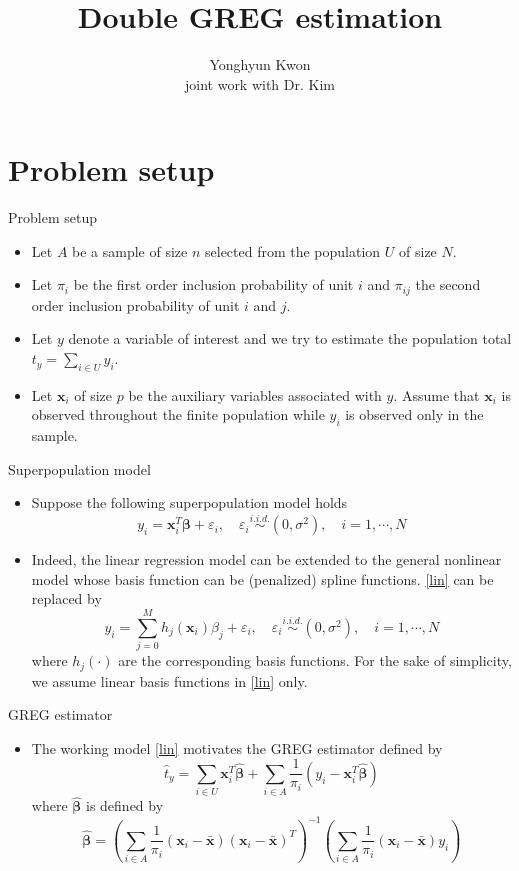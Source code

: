 \documentclass[usenames,dvipsnames, xcolor=table]{beamer}
\author[Kwon]{Yonghyun Kwon
\\ 
joint work with Dr. Kim}
\title[Double GREG]{  
Double GREG estimation
}
\institute{Iowa State Univeristy}
\renewcommand{\bf}[1]{\boldsymbol{\mathbf{#1}}}
\newcommand{\pa}[1]{\left(#1\right)} %
\newcommand{\iid}{\stackrel{i.i.d.}{\sim}}
\begin{document}
\frame{\titlepage}

\section{Problem setup}

\begin{frame}{Problem setup}
\begin{itemize}
    \item Let \(A\) be a sample of size \(n\) selected from the population \(U\) of size \(N\). 
    \item Let $\pi_i$ be the first order inclusion probability of unit $i$ and $\pi_{ij}$ the second order inclusion probability of unit $i$ and $j$.
    \item Let \(y\) denote a variable of interest and we try to estimate the population total \(t_y = \sum_{i \in U} y_i\). 
    \item Let \(\bf x_{i}\) of size \(p\) be the auxiliary variables associated with \(y\). 
Assume that $\bf x_i$ is observed throughout the finite population while $y_i$ is observed only in the sample.
\end{itemize}
\end{frame}

\begin{frame}{Superpopulation model}
    \begin{itemize}
        \item Suppose the following superpopulation model holds
\begin{equation}
    y_i = \bf x_i^T \bf \beta + \varepsilon_i, \quad \varepsilon_i \iid (0,\sigma^2), \quad i = 1, \cdots, N \label{lin}
\end{equation}
\item Indeed, the linear regression model can be extended to the general nonlinear model whose basis function can be (penalized) spline functions. \eqref{lin} can be replaced by
\begin{equation}
    y_i = \sum_{j = 0}^Mh_j(\bf x_i) \beta_j + \varepsilon_i, \quad \varepsilon_i \iid (0,\sigma^2), \quad i = 1, \cdots, N 
\end{equation}
where $h_j(\cdot)$ are the corresponding basis functions. For the sake of simplicity, we assume linear basis functions in \eqref{lin} only.
    \end{itemize}
\end{frame}

\begin{frame}{GREG estimator}
    \begin{itemize}
        \item The working model \eqref{lin} motivates the GREG estimator defined by
\begin{equation}
    \hat t_y = \sum_{i \in U}\bf x_i^T \hat {\bf \beta} + \sum_{i \in A}\frac{1}{\pi_i}\pa{y_i - \bf x_i^T \hat {\bf \beta}} \label{GREG}
\end{equation}
where $\hat {\bf \beta}$ is defined by
$$
\hat {\bf \beta} = \pa{\sum_{i \in A} \frac{1}{\pi_i}\pa{\bf x_i - \bar {\bf x}}\pa{\bf x_i - \bar {\bf x}}^T}^{-1}\pa{\sum_{i \in A} \frac{1}{\pi_i}\pa{\bf x_i - \bar {\bf x}}y_i}
$$
    \end{itemize}
\end{frame}
\end{document}

